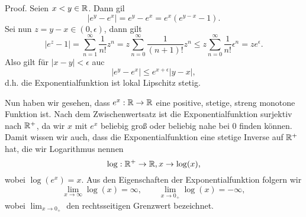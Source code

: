 \begin{emphBox}{}{}
Proof.  Seien \(x  < y \in \mathbb{R}\). Dann gil
\begin{equation*}
 \left\vert e^y - e^x \right\vert = e^y - e^x = e^x ( e^{y-x} - 1).
\end{equation*}
Sei nun \(z=y-x \in (0,\epsilon)\), dann gilt
\begin{equation*}
  \left\vert e^z -  1 \right\vert = \sum_{n=1}^\infty \frac{1}{n!} z^n = z \sum_{n=0}^\infty \frac{1}{(n+1)!} z^n  \leq z \sum_{n=0}^\infty \frac{1}{n!} \epsilon^n = z e^\epsilon.
\end{equation*}
Also gilt für \(|x-y| < \epsilon\) auc
\begin{equation*}
  \left\vert e^y - e^x \right\vert \leq e^{x+\epsilon} |y-x|,
\end{equation*}
d.h. die Exponentialfunktion ist lokal Lipschitz stetig.
\end{emphBox}

Nun haben wir gesehen, dass \(e^x: \mathbb{R} \rightarrow \mathbb{R}\) eine positive, stetige, streng monotone Funktion ist. Nach dem Zwischenwertsatz ist die Exponentialfunktion surjektiv nach \(\mathbb{R}^+\), da wir \(x\) mit \(e^x\) beliebig groß oder beliebig nahe bei \(0\) finden können. Damit wissen wir auch, dass die Exponentialfunktion eine stetige Inverse auf \(\mathbb{R}^+\) hat, die wir Logarithmus nennen
\begin{equation*}
 \log: \mathbb{R}^+ \rightarrow \mathbb{R}, x \rightarrow \log(x),
\end{equation*}
wobei \(\log(e^x) =x\). Aus den Eigenschaften der Exponentialfunktion folgern wir
\begin{equation*}
 \lim_{x\rightarrow \infty} \log(x) = \infty, \qquad \lim_{x\rightarrow 0_+} \log(x) = -\infty,
\end{equation*}
wobei \(\lim_{x\rightarrow 0_+}\) den rechtsseitigen Grenzwert bezeichnet.


